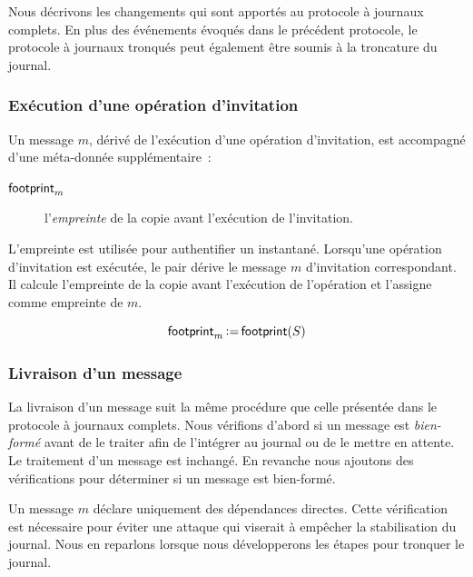 Nous décrivons les changements qui sont apportés au protocole à journaux complets.
En plus des événements évoqués dans le précédent protocole, le protocole à journaux tronqués peut également être soumis à la troncature du journal.

\subsubsection{Exécution d'une opération d'invitation}

Un message $m$, dérivé de l'exécution d'une opération d'invitation, est accompagné d'une méta-donnée supplémentaire~:
\begin{description}
    \item[$\operatorname{\mathsf{footprint}}_m$] l'\emph{empreinte} de la copie avant l'exécution de l'invitation.
\end{description}

L'empreinte est utilisée pour authentifier un instantané.
Lorsqu'une opération d'invitation est exécutée, le pair dérive le message $m$ d'invitation correspondant.
Il calcule l'empreinte de la copie avant l'exécution de l'opération et l'assigne comme empreinte de $m$.

\begin{equation*}
    \operatorname{\mathsf{footprint}}_m \operatorname{\vcentcolon=} \operatorname{\mathsf{footprint}}(S)
\end{equation*}


\subsubsection{Livraison d'un message}

La livraison d'un message suit la même procédure que celle présentée dans le protocole à journaux complets.
Nous vérifions d'abord si un message est \emph{bien-formé} avant de le traiter afin de l'intégrer au journal ou de le mettre en attente.
Le traitement d'un message est inchangé.
En revanche nous ajoutons des vérifications pour déterminer si un message est bien-formé.

Un message $m$ déclare uniquement des dépendances directes.
Cette vérification est nécessaire pour éviter une attaque qui viserait à empêcher la stabilisation du journal.
Nous en reparlons lorsque nous développerons les étapes pour tronquer le journal.

